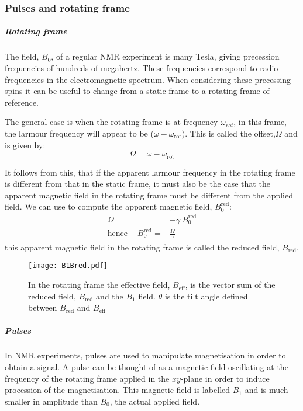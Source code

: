 \subsubsection{Pulses and rotating frame}

\subparagraph{Rotating frame}

The field, $B_0$, of a regular NMR experiment is many Tesla, giving precession
frequencies of hundreds of megahertz. These frequencies correspond to radio frequencies in the electromagnetic spectrum. When considering these precessing spins
it can be useful to change from a static frame to a rotating frame of reference.

The general case is when the rotating frame is at frequency $\omega_{rot}$, in this
frame, the larmour frequency will appear to be ($\omega - \omega_{\text{rot}})$. This is called the offset,$\Omega$ and is given by:
\begin{equation}
  \Omega = \omega -\omega_{\text{rot}}
\end{equation}

It follows from this, that if the apparent larmour frequency in the rotating frame is different from that in the static frame, it must also be the case that the apparent magnetic field in the rotating frame must be different from the applied
field. We can use  to compute the apparent magnetic field, $B^{\text{red}}_0$:
\begin{align}\label{eqn:redB}
  \Omega =& -\gamma~B^{\text{red}}_0\\
\text{hence}\quad~B^{\text{red}}_0 =& \frac{\Omega}{\gamma}
\end{align}
this apparent magnetic field in the rotating frame is called the reduced field, $B_{\text{red}}$.

\begin{figure}
  \begin{center}
  \texttt{[image: B1Bred.pdf]}
  \end{center}
  \caption{In the rotating frame the effective field, $B_{\text{eff}}$, is the vector sum of the reduced field,
  $B_{\text{red}}$ and the $B_1$ field. $\theta$ is the tilt angle defined between $B_{\text{red}}$ and $B_{\text{eff}}$}
  \label{fig:BMag}
\end{figure}


\subparagraph{Pulses}

In NMR experiments, pulses are used to manipulate magnetisation in order to obtain a signal. A pulse can be
thought of as a magnetic field oscillating at the frequency of the rotating frame
applied in the $xy$-plane in order to induce procession of the magnetisation. This magnetic field is labelled $B_1$ and is much smaller in amplitude than $B_0$, the actual applied field.

